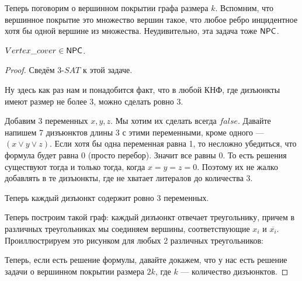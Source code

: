 \documentclass[a4paper, 12pt]{article}
\begin{document}
Теперь поговорим о вершинном покрытии графа размера $k$. 
Вспомним, что вершинное покрытие
это множество вершин такое, что любое ребро инцидентное хотя бы одной вершине
из множества. Неудивительно, эта задача тоже $\mathsf{NPC}$.

\begin{Theorem}
  $Vertex\_cover \in \mathsf{NPC}$.
\end{Theorem}

\begin{proof}
  Сведём 3-$SAT$ к этой задаче.

  Ну здесь как раз нам и понадобится факт, что в любой КНФ, где дизъюнкты имеют
  размер не более 3, можно сделать ровно 3.

  Добавим 3 переменных $x, y, z$. Мы хотим их сделать всегда $false$. Давайте
  напишем 7 дизъюнктов длины 3 с этими переменными, кроме одного --- 
  $(x \vee y \vee z)$. Если хотя бы одна переменная равна 1, то несложно 
  убедиться, что 
  формула будет равна 0 (просто перебор). Значит все равны 0. То есть решения
  существуют тогда и только тогда, когда $x = y = z = 0$. Поэтому их не жалко
  добавлять в те дизъюнкты, где не хватает литералов до количества 3.

  Теперь каждый дизъюнкт содержит ровно 3 переменных.

  Теперь построим такой граф: каждый дизъюнкт отвечает треугольнику, причем
  в различных треугольниках мы соединяем вершины, соответствующие $x_i$ и 
  $\overline{x_i}$. Проиллюстрируем это рисунком для любых 2 различных
  треугольников:

  \begin{center}
    \end{center}

  Теперь, если есть решение формулы, давайте докажем, что у нас есть решение
  задачи о вершинном покрытии размера $2k$, где $k$ --- количество дизъюнктов.


\end{proof}
\end{document}
